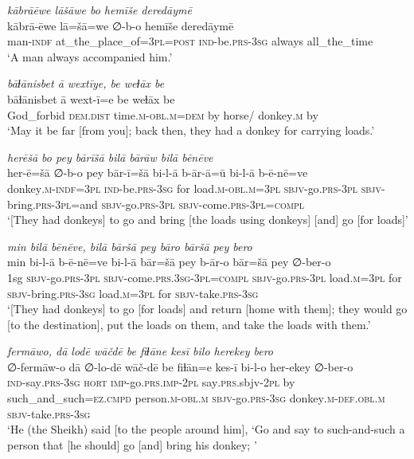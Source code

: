 \ea \label{HB.7}
\textit{kābrāēwe lāšāwe bo hemīše deredāymē} \\ 
\gll kābrā-ēwe lā=šā=we ∅-b-o hemīše deredāymē \\ 
 man\textsc{-indf} at\_the\_place\_of\textsc{=3pl}\textsc{=\textsc{post}} \textsc{ind-}be\textsc{.prs}\textsc{-3sg} always all\_the\_time \\ 
\glt `A man always accompanied him.'
\z 
 
\ea \label{HB.8}
\textit{bāɫānisbet ā wextīye, be weɫāx be} \\ 
\gll bāɫānisbet ā wext-ī=e be weɫāx be \\ 
 God\_forbid \textsc{dem.dist} time\textsc{.m}\textsc{-obl}\textsc{.m}\textsc{=dem} by horse/ donkey\textsc{.m} by \\ 
\glt `May it be far [from you]; back then, they had a donkey for carrying loads.'
\z 
 
\ea \label{HB.9}
\textit{herēšā bo pey bārīšā bilā bārāw bilā bēnēve} \\ 
\gll her-ē=šā ∅-b-o pey bār-ī=šā bi-l-ā b-ār-ā=ū bi-l-ā b-ē-nē=ve \\ 
 donkey\textsc{.m}\textsc{-indf}\textsc{=3pl} \textsc{ind-}be\textsc{.prs}\textsc{-3sg} for load\textsc{.m}\textsc{-obl}\textsc{.m}\textsc{=3pl} \textsc{sbjv-}go\textsc{.prs}\textsc{-3pl} \textsc{sbjv-}bring\textsc{.prs}\textsc{-3pl}=and \textsc{sbjv-}go\textsc{.prs}\textsc{-3pl} \textsc{sbjv-}come\textsc{.prs}\textsc{-3pl}\textsc{=compl} \\ 
\glt `[They had donkeys] to go and bring [the loads using donkeys] [and] go [for loads]'
\z 
 
\ea \label{HB.10}
\textit{min bilā bēnēve, bilā bāršā pey bāro bāršā pey bero} \\ 
\gll min bi-l-ā b-ē-nē=ve bi-l-ā bār=šā pey b-ār-o bār=šā pey ∅-ber-o \\ 
 1sg \textsc{sbjv-}go\textsc{.prs}\textsc{-3pl} \textsc{sbjv-}come\textsc{.prs}\textsc{.3sg}\textsc{-3pl}\textsc{=compl} \textsc{sbjv-}go\textsc{.prs}\textsc{-3pl} load\textsc{.m}\textsc{=3pl} for \textsc{sbjv-}bring\textsc{.prs}\textsc{-3sg} load\textsc{.m}\textsc{=3pl} for \textsc{sbjv-}take\textsc{.prs}\textsc{-3sg} \\ 
\glt `[They had donkeys] to go [for loads] and return [home with them]; they would go [to the destination], put the loads on them, and take the loads with them.'
\z 
 
\ea \label{HB.11}
\textit{fermāwo, dā lodē wāčdē be fiɫāne kesī bilo herekey bero} \\ 
\gll ∅-fermāw-o dā ∅-lo-dē wāč-dē be fiɫān=e kes-ī bi-l-o her-ekey ∅-ber-o \\ 
 \textsc{ind-}say\textsc{.prs}\textsc{-3sg} \textsc{hort} \textsc{imp-}go\textsc{.prs}\textsc{.imp}\textsc{-2pl} say\textsc{.prs}.sbjv\textsc{-2pl} by such\_and\_such\textsc{=ez}\textsc{.cmpd} person\textsc{.m}\textsc{-obl}\textsc{.m} \textsc{sbjv-}go\textsc{.prs}\textsc{-3sg} donkey\textsc{.m}\textsc{-def}\textsc{.obl}\textsc{.m} \textsc{sbjv-}take\textsc{.prs}\textsc{-3sg} \\ 
\glt `He (the Sheikh) said [to the people around him], ‘Go and say to such-and-such a person that [he should] go [and] bring his donkey; '
\z 
 
